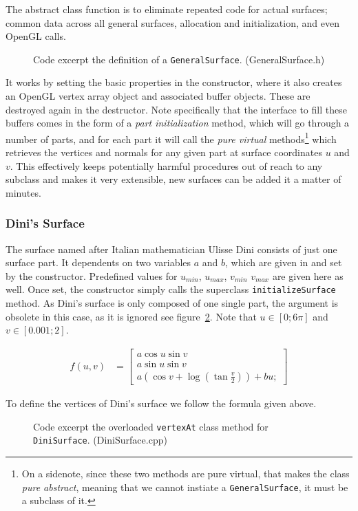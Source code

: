 \documentclass[11pt]{article}
\newcommand{\figref}[1]{see figure~\ref{#1}}
\newcommand{\code}[1]{{\tt #1}}
\newcommand{\codefig}[5]
{
\begin{figure}[H]
    
    \caption{Code excerpt #5 (#2)}
    \label{code:#1}
\end{figure}
}
\begin{document}
The abstract class function is to eliminate repeated code for actual surfaces;
common data across all general surfaces, allocation and initialization, and
even OpenGL calls.
\codefig{general-surface-header}{GeneralSurface.h}{27}{52}
{the definition of a \code{GeneralSurface}.}

It works by setting the basic properties in the constructor, where it also
creates an OpenGL vertex array object and associated buffer objects. These are
destroyed again in the destructor. Note specifically that the interface to
fill these buffers comes in the form of a {\it part initialization} method,
which will go through a number of parts, and for each part it will call the
{\it pure virtual} methods\footnote{On a sidenote, since these two methods are
pure virtual, that makes the class {\it pure abstract}, meaning that we cannot
instiate a \code{GeneralSurface}, it must be a subclass of it.} which
retrieves the vertices and normals for any given part at surface coordinates
$u$ and $v$. This effectively keeps potentially harmful procedures out of
reach to any subclass and makes it very extensible, new surfaces can be added
it a matter of minutes. 

\newpage
\subsubsection{Dini's Surface}
The surface named after Italian mathematician Ulisse Dini consists of just one
surface part. It dependents on two variables $a$ and $b$, which are given in
and set by the constructor. Predefined values for $u_{min}$, $u_{max}$,
$v_{min}$ $v_{max}$ are given here as well. Once set, the constructor simply
calls the superclass \code{initializeSurface} method. As Dini's surface is
only composed of one single part, the argument is obsolete in this case,
as it is ignored \figref{code:dini-surface-vtx}. Note that $u \in [0;6\pi]$
and $v \in [0.001;2]$.

\begin{align}
    f(u,v) &=
    \begin{bmatrix}
        a \cos u \sin v \\
        a \sin u \sin v \\
        a (\cos v + \log(\tan \frac{v}{2})) + b u;
    \end{bmatrix}
\end{align}

To define the vertices of Dini's surface we follow the formula given above. 
\codefig{dini-surface-vtx}{DiniSurface.cpp}{29}{33}
{the overloaded \code{vertexAt} class method for \code{DiniSurface}.}
\end{document}
